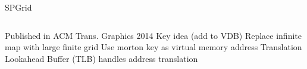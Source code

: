 \begin{frame}{SPGrid}
\begin{columns}
\centering
\begin{outline}
    \1 Published in ACM Trans. Graphics 2014 \cite{Setaluri2014}
    \1 Key idea (add to VDB)
      \1 Replace infinite map with large finite grid
      \2 Use morton key as virtual memory address
      \2 Translation Lookahead Buffer (TLB) handles address translation
\end{outline}
\centering
{}


\end{columns}

\end{frame}
